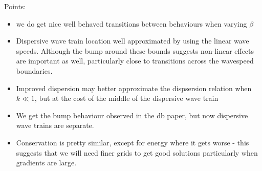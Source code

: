 \documentclass[10pt]{elsarticle}
\begin{document}
Points:
\begin{itemize}
	\item we do get nice well behaved transitions between behaviours when varying $\beta$
	\item Dispersive wave train location well approximated by using the linear wave speeds. Although the bump around these bounds suggests non-linear effects are important as well, particularly close to transitions across the wavespeed boundaries. 
	\item Improved dispersion may better approximate the dispsersion relation when $k\ll 1$, but at the cost of the middle of the dispersive wave train
	\item We get the bump behaviour observed in the db paper, but now dispersive wave trains are separate.
	\item Conservation is pretty similar, except for energy where it gets worse - this suggests that we will need finer grids to get good solutions particularly when gradients are large.
\end{itemize}
\end{document}
